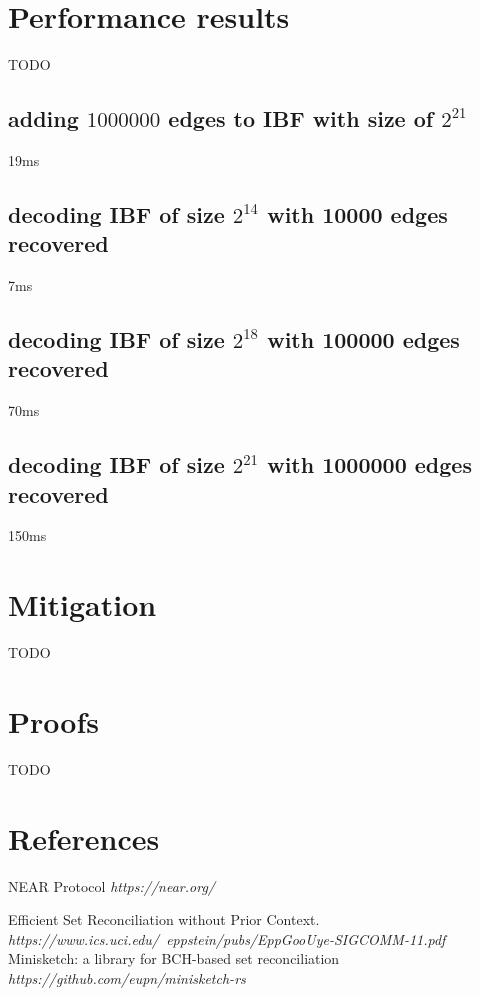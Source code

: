 \documentclass[11pt]{article}
\begin{document}
\section{Performance results}
TODO
\subsection{adding $1000000$ edges to IBF with size of $2^{21}$}
19ms
\subsection{decoding IBF of size $2^{14}$ with 10000 edges recovered}
7ms
\subsection{decoding IBF of size $2^{18}$ with 100000 edges recovered}
70ms
\subsection{decoding IBF of size $2^{21}$ with 1000000 edges recovered}
150ms

\section{Mitigation}\label{sec:mitigation}
TODO

\section{Proofs}
TODO

\section{References}

\begin{thebibliography}{9}
NEAR Protocol
\textit{https://near.org/}

Efficient Set Reconciliation without Prior Context.
\textit{https://www.ics.uci.edu/~eppstein/pubs/EppGooUye-SIGCOMM-11.pdf}
Minisketch: a library for BCH-based set reconciliation
\textit{https://github.com/eupn/minisketch-rs}
\end{thebibliography}
\end{document}
